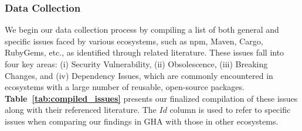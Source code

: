 \documentclass[conference]{IEEEtran}
\begin{document}
            \subsubsection{\textbf{Data Collection}}
We begin our data collection process by compiling a list of both general and specific issues faced by various ecosystems, such as npm, Maven, Cargo, RubyGems, etc., as identified through related literature. These issues fall into four key areas: (i) Security Vulnerability, (ii) Obsolescence, (iii) Breaking Changes, and (iv) Dependency Issues, which are commonly encountered in ecosystems with a large number of reusable, open-source packages. \textbf{Table~\ref{tab:compiled_issues}} presents our finalized compilation of these issues along with their referenced literature. The $Id$ column is used to refer to specific issues when comparing our findings in GHA with those in other ecosystems.\\
\end{document}
